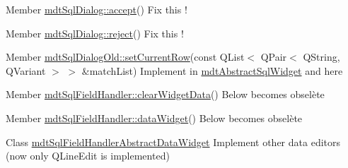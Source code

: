 \begin{DoxyDescription}
\item[Member \hyperlink{classmdt_sql_dialog_affba1732b5f32db150d0e700ecc339f8}{mdtSqlDialog::accept}() ]Fix this ! 
\end{DoxyDescription}

\label{todo__todo000002}
\hypertarget{todo__todo000002}{}
 
\begin{DoxyDescription}
\item[Member \hyperlink{classmdt_sql_dialog_ada1726d5861cb071fab7a1c31bc52abb}{mdtSqlDialog::reject}() ]Fix this ! 
\end{DoxyDescription}

\label{todo__todo000085}
\hypertarget{todo__todo000085}{}
 
\begin{DoxyDescription}
\item[Member \hyperlink{classmdt_sql_dialog_old_a658d4a0a9bc97cb8a354a5b2157ab1a0}{mdtSqlDialogOld::setCurrentRow}(const QList$<$ QPair$<$ QString, QVariant $>$ $>$ \&matchList) ]Implement in \hyperlink{classmdt_abstract_sql_widget}{mdtAbstractSqlWidget} and here 
\end{DoxyDescription}

\label{todo__todo000088}
\hypertarget{todo__todo000088}{}
 
\begin{DoxyDescription}
\item[Member \hyperlink{classmdt_sql_field_handler_ad482be9d476c3310373078a6cd949714}{mdtSqlFieldHandler::clearWidgetData}() ]Below becomes obselète 
\end{DoxyDescription}

\label{todo__todo000087}
\hypertarget{todo__todo000087}{}
 
\begin{DoxyDescription}
\item[Member \hyperlink{classmdt_sql_field_handler_a91ab8160d5015b6030e7169ab7108d33}{mdtSqlFieldHandler::dataWidget}() ]Below becomes obselète 
\end{DoxyDescription}

\label{todo__todo000086}
\hypertarget{todo__todo000086}{}
 
\begin{DoxyDescription}
\item[Class \hyperlink{classmdt_sql_field_handler_abstract_data_widget}{mdtSqlFieldHandlerAbstractDataWidget} ]Implement other data editors (now only QLineEdit is implemented) 
\end{DoxyDescription}

